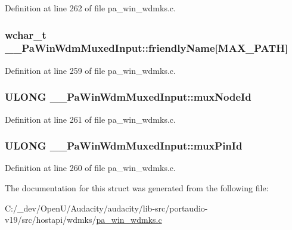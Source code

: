 Definition at line 262 of file pa\+\_\+win\+\_\+wdmks.\+c.

\subsubsection[{\texorpdfstring{friendly\+Name}{friendlyName}}]{\setlength{\rightskip}{0pt plus 5cm}wchar\+\_\+t \+\_\+\+\_\+\+Pa\+Win\+Wdm\+Muxed\+Input\+::friendly\+Name\mbox{[}M\+A\+X\+\_\+\+P\+A\+TH\mbox{]}}\hypertarget{struct_____pa_win_wdm_muxed_input_a07079d0c8604c5a64fc338263c5e2468}{}\label{struct_____pa_win_wdm_muxed_input_a07079d0c8604c5a64fc338263c5e2468}


Definition at line 259 of file pa\+\_\+win\+\_\+wdmks.\+c.

\subsubsection[{\texorpdfstring{mux\+Node\+Id}{muxNodeId}}]{\setlength{\rightskip}{0pt plus 5cm}U\+L\+O\+NG \+\_\+\+\_\+\+Pa\+Win\+Wdm\+Muxed\+Input\+::mux\+Node\+Id}\hypertarget{struct_____pa_win_wdm_muxed_input_a0c99dd95a1181833c2f8758ce8e76331}{}\label{struct_____pa_win_wdm_muxed_input_a0c99dd95a1181833c2f8758ce8e76331}


Definition at line 261 of file pa\+\_\+win\+\_\+wdmks.\+c.

\subsubsection[{\texorpdfstring{mux\+Pin\+Id}{muxPinId}}]{\setlength{\rightskip}{0pt plus 5cm}U\+L\+O\+NG \+\_\+\+\_\+\+Pa\+Win\+Wdm\+Muxed\+Input\+::mux\+Pin\+Id}\hypertarget{struct_____pa_win_wdm_muxed_input_a8fb0e8c234c7f14108aa2926e1142d20}{}\label{struct_____pa_win_wdm_muxed_input_a8fb0e8c234c7f14108aa2926e1142d20}


Definition at line 260 of file pa\+\_\+win\+\_\+wdmks.\+c.



The documentation for this struct was generated from the following file\+:\begin{DoxyCompactItemize}
\item 
C\+:/\+\_\+dev/\+Open\+U/\+Audacity/audacity/lib-\/src/portaudio-\/v19/src/hostapi/wdmks/\hyperlink{pa__win__wdmks_8c}{pa\+\_\+win\+\_\+wdmks.\+c}\end{DoxyCompactItemize}
